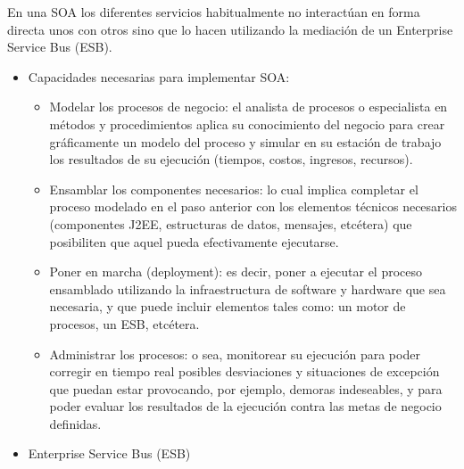 En una SOA los diferentes servicios habitualmente no interactúan en forma directa unos con otros sino que lo hacen utilizando la mediación de un Enterprise Service Bus (ESB).

\begin{itemize}

\item Capacidades necesarias para implementar SOA:
\begin{itemize}
\item Modelar los procesos de negocio: el analista de procesos o especialista en métodos y procedimientos aplica su conocimiento del negocio para crear gráficamente un modelo del proceso y simular en su estación de trabajo los resultados de su ejecución (tiempos, costos, ingresos, recursos).
\item Ensamblar los componentes necesarios: lo cual implica completar el proceso modelado en el paso anterior con los elementos técnicos necesarios (componentes J2EE, estructuras de datos, mensajes, etcétera) que posibiliten que aquel pueda efectivamente ejecutarse.
\item Poner en marcha (deployment): es decir, poner a ejecutar el proceso ensamblado utilizando la infraestructura de software y hardware que sea necesaria, y que puede incluir elementos tales como: un motor de procesos, un ESB, etcétera.
\item Administrar los procesos: o sea, monitorear su ejecución para poder corregir en tiempo real posibles desviaciones y situaciones de excepción que puedan estar provocando, por ejemplo, demoras indeseables, y para poder evaluar los resultados de la ejecución contra las metas de negocio definidas.
\end{itemize}

\item Enterprise Service Bus (ESB)


\end{itemize}
